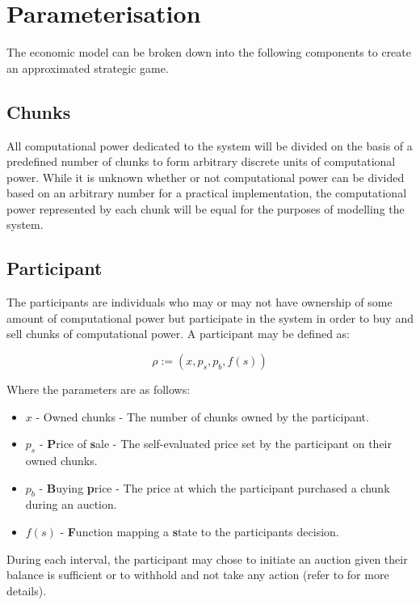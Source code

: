 \section{Parameterisation} \label{section:parameterisation}

The economic model can be broken down into the following components to create an approximated strategic game.

\subsection{Chunks}

All computational power dedicated to the system will be divided on the basis of a predefined number of chunks to form arbitrary discrete units of computational power. While it is unknown whether or not computational power can be divided based on an arbitrary number for a practical implementation, the computational power represented by each chunk will be equal for the purposes of modelling the system.

\subsection{Participant}

The participants are individuals who may or may not have ownership of some amount of computational power but participate in the system in order to buy and sell chunks of computational power. A participant may be defined as:

\begin{equation}
    \rho := (x, p_s, p_b, f(s))
\end{equation}

\noindent Where the parameters are as follows:
\begin{itemize}
    \item $x$ - Owned chunks - The number of chunks owned by the participant.
    \item $p_s$ - \textbf{P}rice of \textbf{s}ale - The self-evaluated price set by the participant on their owned chunks.
    \item $p_b$ - \textbf{B}uying \textbf{p}rice - The price at which the participant purchased a chunk during an auction.
    \item $f(s)$ - \textbf{F}unction mapping a \textbf{s}tate to the participants decision.
\end{itemize}

During each interval, the participant may chose to initiate an auction given their balance is sufficient or to withhold and not take any action (refer to  for more details).

